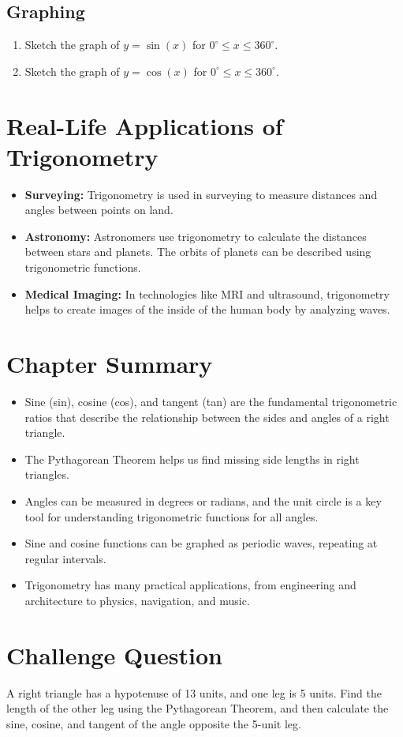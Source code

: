 \subsection{Graphing}
\begin{enumerate}
    \item Sketch the graph of $y = \sin(x)$ for $0^\circ \leq x \leq 360^\circ$.
    \item Sketch the graph of $y = \cos(x)$ for $0^\circ \leq x \leq 360^\circ$.
\end{enumerate}

\section{Real-Life Applications of Trigonometry}
\begin{itemize}
    \item \textbf{Surveying:} Trigonometry is used in surveying to measure distances and angles between points on land.
    \item \textbf{Astronomy:} Astronomers use trigonometry to calculate the distances between stars and planets. The orbits of planets can be described using trigonometric functions.
    \item \textbf{Medical Imaging:} In technologies like MRI and ultrasound, trigonometry helps to create images of the inside of the human body by analyzing waves.
\end{itemize}

\section{Chapter Summary}
\begin{itemize}
    \item Sine (sin), cosine (cos), and tangent (tan) are the fundamental trigonometric ratios that describe the relationship between the sides and angles of a right triangle.
    \item The Pythagorean Theorem helps us find missing side lengths in right triangles.
    \item Angles can be measured in degrees or radians, and the unit circle is a key tool for understanding trigonometric functions for all angles.
    \item Sine and cosine functions can be graphed as periodic waves, repeating at regular intervals.
    \item Trigonometry has many practical applications, from engineering and architecture to physics, navigation, and music.
\end{itemize}

\section{Challenge Question}
A right triangle has a hypotenuse of 13 units, and one leg is 5 units. Find the length of the other leg using the Pythagorean Theorem, and then calculate the sine, cosine, and tangent of the angle opposite the 5-unit leg.